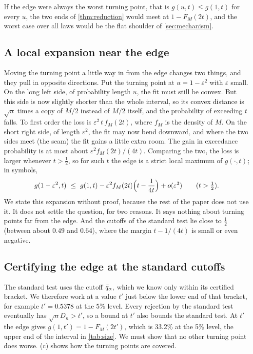If the edge were always the worst turning point, that is $g(u,t)\le g(1,t)$ for every $u$, the two ends of \cref{thm:reduction} would meet at $1-F_M(2t)$, and the worst case over all laws would be the flat shoulder of \cref{sec:mechanism}.

\subsection{A local expansion near the edge}
Moving the turning point a little way in from the edge changes two things, and they pull in opposite directions. Put the turning point at $u=1-\varepsilon^2$ with $\varepsilon$ small. On the long left side, of probability length $u$, the fit must still be convex. But this side is now slightly shorter than the whole interval, so its convex distance is $\sqrt u$ times a copy of $M/2$ instead of $M/2$ itself, and the probability of exceeding $t$ falls. To first order the loss is $\varepsilon^2\,t\,f_M(2t)$, where $f_M$ is the density of $M$. On the short right side, of length $\varepsilon^2$, the fit may now bend downward, and where the two sides meet (the seam) the fit gains a little extra room. The gain in exceedance probability is at most about $\varepsilon^2 f_M(2t)/(4t)$. Comparing the two, the loss is larger whenever $t>\frac12$, so for such $t$ the edge is a strict local maximum of $g(\cdot,t)$; in symbols,
\[
g(1-\varepsilon^2,t)\ \le\ g(1,t)-\varepsilon^2f_M(2t)\Bigl(t-\frac1{4t}\Bigr)+o(\varepsilon^2)\qquad(t>\tfrac12).
\]
We state this expansion without proof, because the rest of the paper does not use it. It does not settle the question, for two reasons. It says nothing about turning points far from the edge. And the cutoffs of the standard test lie close to $\frac12$ (between about $0.49$ and $0.64$), where the margin $t-1/(4t)$ is small or even negative.

\subsection{Certifying the edge at the standard cutoffs}
The standard test uses the cutoff $\bar q_\alpha$, which we know only within its certified bracket. We therefore work at a value $t'$ just below the lower end of that bracket, for example $t'=0.5378$ at the 5\% level. Every rejection by the standard test eventually has $\sqrt nD_n>t'$, so a bound at $t'$ also bounds the standard test. At $t'$ the edge gives $g(1,t')=1-F_M(2t')$, which is 33.2\% at the 5\% level, the upper end of the interval in \cref{tab:size}. We must show that no other turning point does worse. (c) shows how the turning points are covered.


